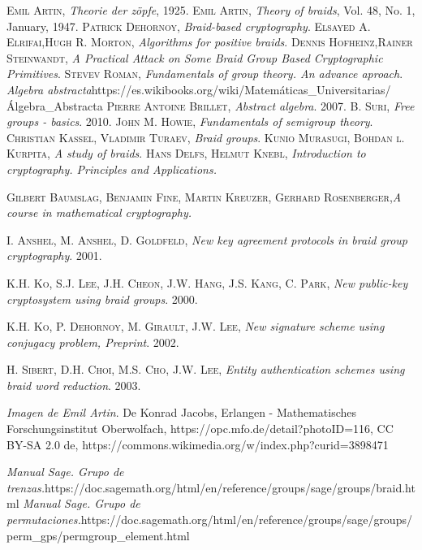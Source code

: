 \documentclass[12pt]{book}
\theoremstyle{definition}
\begin{document}
\begin{thebibliography}{X}
\textsc{Emil Artin}, \textit{Theorie der z\"opfe}, 1925.
\textsc{Emil Artin}, \textit{Theory of braids}, Vol. 48, No. 1, January, 1947.
\textsc{Patrick Dehornoy}, \textit{Braid-based cryptography}.
\textsc{Elsayed A. Elrifai},\textsc{Hugh R. Morton}, \textit{Algorithms for positive braids}.
\textsc{Dennis Hofheinz},\textsc{Rainer Steinwandt}, \textit{A Practical Attack on Some Braid Group Based
Cryptographic Primitives}.
\textsc{Stevev Roman}, \textit{Fundamentals of group theory. An advance aproach}.
\textit{Algebra abstracta}\newline https://es.wikibooks.org/wiki/Matemáticas\_Universitarias/Álgebra\_Abstracta
\textsc{Pierre Antoine Brillet}, \textit{Abstract algebra}. 2007.
\textsc{B. Suri}, \textit{Free groups - basics}. 2010.
\textsc{John M. Howie}, \textit{Fundamentals of semigroup theory}.
\textsc{Christian Kassel}, \textsc{Vladimir Turaev}, \textit{Braid groups}.
\textsc{Kunio Murasugi}, \textsc{Bohdan l. Kurpita}, \textit{A study of braids}.
\textsc{Hans Delfs}, \textsc{Helmut Knebl}, \textit{Introduction to cryptography. Principles and Applications.}

\textsc{Gilbert Baumslag}, \textsc{Benjamin Fine},  \textsc{Martin Kreuzer}, \textsc{Gerhard Rosenberger},\textit{A course in mathematical cryptography.}

\textsc{I. Anshel}, \textsc{M. Anshel}, \textsc{D. Goldfeld}, \textit{New key agreement protocols in braid group cryptography}. 2001.


\textsc{K.H. Ko}, \textsc{S.J. Lee}, \textsc{J.H. Cheon}, \textsc{J.W. Hang}, \textsc{J.S. Kang}, \textsc{C. Park}, \textit{New public-key cryptosystem using braid groups}. 2000.

\textsc{K.H. Ko}, \textsc{P. Dehornoy}, \textsc{M. Girault}, \textsc{J.W. Lee}, \textit{New signature scheme using conjugacy problem, Preprint}. 2002.

\textsc{H. Sibert}, \textsc{D.H. Choi}, \textsc{M.S. Cho}, \textsc{J.W. Lee}, \textit{Entity authentication schemes using braid word reduction}. 2003.

\textit{Imagen de Emil Artin}. De Konrad Jacobs, Erlangen - Mathematisches Forschungsinstitut Oberwolfach, https://opc.mfo.de/detail?photoID=116, CC BY-SA 2.0 de, https://commons.wikimedia.org/w/index.php?curid=3898471


\textit{Manual Sage. Grupo de trenzas.}\newline https://doc.sagemath.org/html/en/reference/groups/sage/groups/braid.html
 \textit{Manual Sage. Grupo de permutaciones.}\newline https://doc.sagemath.org/html/en/reference/groups/sage/groups/perm\_gps/\newline permgroup\_element.html
\end{thebibliography}













		
\end{document}
